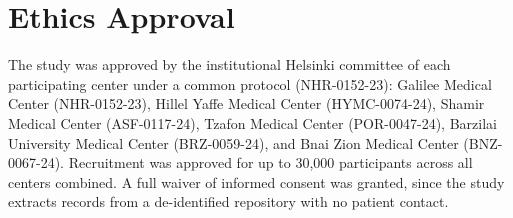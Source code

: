 \section*{Ethics Approval}
The study was approved by the institutional Helsinki committee of each
participating center under a common protocol (NHR-0152-23): Galilee Medical
Center (NHR-0152-23), Hillel Yaffe Medical Center (HYMC-0074-24), Shamir
Medical Center (ASF-0117-24), Tzafon Medical Center (POR-0047-24), Barzilai
University Medical Center (BRZ-0059-24), and Bnai Zion Medical Center
(BNZ-0067-24). Recruitment was approved for up to 30,000 participants across
all centers combined. A full waiver of informed consent was granted, since
the study extracts records from a de-identified repository with no patient
contact.
